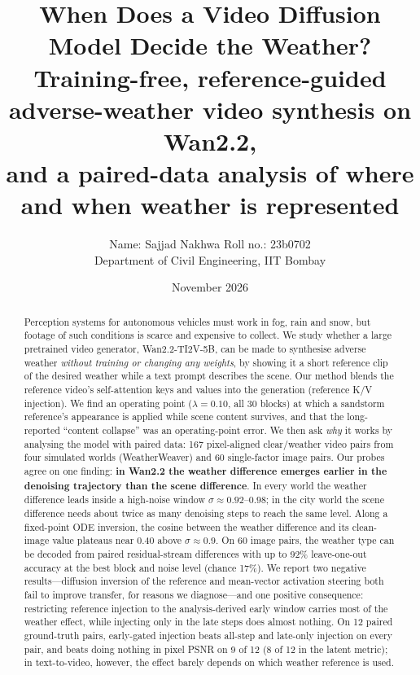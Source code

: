 \documentclass[11pt,a4paper]{article}
\title{\textbf{When Does a Video Diffusion Model Decide the Weather?}\\[4pt]
\large Training-free, reference-guided adverse-weather video synthesis on Wan2.2,\\
and a paired-data analysis of where and when weather is represented}
\author{Name: Sajjad Nakhwa \quad Roll no.: 23b0702\\
Department of Civil Engineering, IIT Bombay}
\date{November 2026}
\newcommand{\lam}{\lambda}
\begin{document}
\maketitle

\begin{abstract}
Perception systems for autonomous vehicles must work in fog, rain and snow, but footage of such conditions is scarce and expensive to collect.
We study whether a large pretrained video generator, Wan2.2-TI2V-5B, can be made to synthesise adverse weather \emph{without training or changing any weights}, by showing it a short reference clip of the desired weather while a text prompt describes the scene.
Our method blends the reference video's self-attention keys and values into the generation (reference K/V injection).
We find an operating point ($\lam{=}0.10$, all 30 blocks) at which a sandstorm reference's appearance is applied while scene content survives, and that the long-reported ``content collapse'' was an operating-point error.
We then ask \emph{why} it works by analysing the model with paired data: 167 pixel-aligned clear/weather video pairs from four simulated worlds (WeatherWeaver) and 60 single-factor image pairs.
Our probes agree on one finding: \textbf{in Wan2.2 the weather difference emerges earlier in the denoising trajectory than the scene difference}. In every world the weather difference leads inside a high-noise window $\sigma \approx 0.92$--$0.98$; in the city world the scene difference needs about twice as many denoising steps to reach the same level. Along a fixed-point ODE inversion, the cosine between the weather difference and its clean-image value plateaus near 0.40 above $\sigma \approx 0.9$.
On 60 image pairs, the weather type can be decoded from paired residual-stream differences with up to 92\% leave-one-out accuracy at the best block and noise level (chance 17\%).
We report two negative results---diffusion inversion of the reference and mean-vector activation steering both fail to improve transfer, for reasons we diagnose---and one positive consequence: restricting reference injection to the analysis-derived early window carries most of the weather effect, while injecting only in the late steps does almost nothing. On 12 paired ground-truth pairs, early-gated injection beats all-step and late-only injection on every pair, and beats doing nothing in pixel PSNR on 9 of 12 (8 of 12 in the latent metric); in text-to-video, however, the effect barely depends on which weather reference is used.
\end{abstract}
\end{document}
